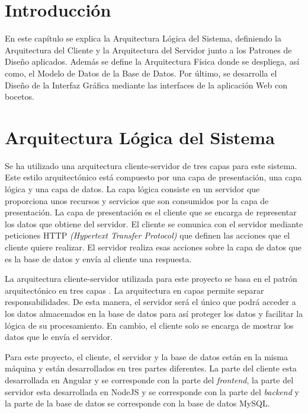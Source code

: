 


\section{Introducción}
En este capítulo se explica la Arquitectura Lógica del Sistema, definiendo la Arquitectura del Cliente y la Arquitectura del Servidor junto a los Patrones de Diseño aplicados. Además se define la Arquitectura Física donde se despliega, así como, el Modelo de Datos de la Base de Datos. Por último, se desarrolla el Diseño de la Interfaz Gráfica mediante las interfaces de la aplicación Web con bocetos.



\section{Arquitectura Lógica del Sistema}
Se ha utilizado una arquitectura cliente-servidor \cite{arquitectura-capas} de tres capas para este sistema. Este estilo arquitectónico está compuesto por una capa de presentación, una capa lógica y una capa de datos. La capa lógica consiste en un servidor que proporciona unos recursos y servicios que son consumidos por la capa de presentación. La capa de presentación es el cliente que se encarga de representar los datos que obtiene del servidor. El cliente se comunica con el servidor mediante peticiones HTTP \textit{(Hypertext Transfer Protocol)} que definen las acciones que el cliente quiere realizar. El servidor realiza esas acciones sobre la capa de datos que es la base de datos y envía al cliente una respuesta.

La arquitectura cliente-servidor utilizada para este proyecto se basa en el patrón arquitectónico en tres capas \cite{capas}. La arquitectura en capas permite separar responsabilidades. De esta manera, el servidor será el único que podrá acceder a los datos almacenados en la base de datos para así proteger los datos y facilitar la lógica de su procesamiento. En cambio, el cliente solo se encarga de mostrar los datos que le envía el servidor.

Para este proyecto, el cliente, el servidor y la base de datos están en la misma máquina y están desarrollados en tres partes diferentes. La parte del cliente esta desarrollada en Angular y se corresponde con la parte del \textit{frontend}, la parte del servidor esta desarrollada en NodeJS y se corresponde con la parte del \textit{backend} y la parte de la base de datos se corresponde con la base de datos MySQL.

